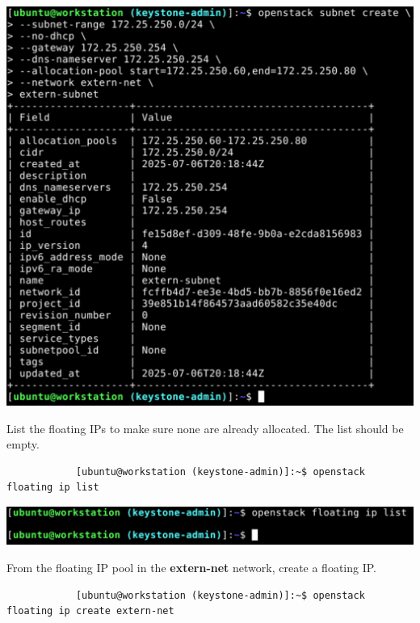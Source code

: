 \documentclass[letterpaper, 12pt]{article}
\begin{document}
\begin{enumerate}
\begin{labstep}
        \begin{center}
            \includegraphics[width=\linewidth]{images/part1/step14.png}
        \end{center}
    \end{labstep}

    \begin{labstep}
        List the floating IPs to make sure none are already allocated.
        The list should be empty.
        \begin{lstlisting}
            [ubuntu@workstation (keystone-admin)]:~$ openstack floating ip list
        \end{lstlisting}

        \begin{center}
            \includegraphics[width=\linewidth]{images/part1/step15.png}
        \end{center}
    \end{labstep}

    \begin{labstep}
        From the floating IP pool in the \textbf{extern-net} network, create a floating IP.
        \begin{lstlisting}
            [ubuntu@workstation (keystone-admin)]:~$ openstack floating ip create extern-net
        \end{lstlisting}


\end{labstep}
\end{enumerate}
\end{document}
